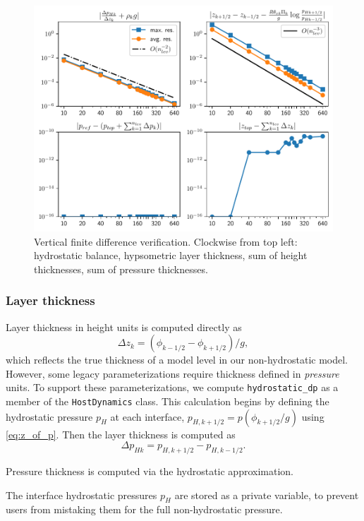 \begin{figure}[H]
\centering 
\includegraphics[width=0.8\linewidth]{figures/vconv_plot}
\caption{Vertical finite difference verification. Clockwise from top left: hydrostatic balance, hypsometric layer thickness, sum of height thicknesses, sum of pressure thicknesses.}\label{fig:fd_verification}
\end{figure}

\subsubsection{Layer thickness}

Layer thickness in height units is computed directly as 
\begin{equation}\label{eq:z_thick}
  \Delta z_k = \left(\phi_{k-1/2} - \phi_{k+1/2}\right)/g,
\end{equation}
which reflects the true thickness of a model level in our non-hydrostatic model.
However, some legacy parameterizations require thickness defined in \emph{pressure} units.
To support these parameterizations, we compute \texttt{hydrostatic\_dp} as a member of the \texttt{HostDynamics} class.
This calculation begins by defining the hydrostatic pressure $p_H$ at each interface, $p_{H,k+1/2} = p(\phi_{k+1/2}/g)$ using \eqref{eq:z_of_p}.
Then the layer thickness is computed as
\begin{equation}\label{eq:p_thick}
  \Delta p_{Hk} = p_{H,k+1/2} - p_{H,k-1/2}.
\end{equation}
\begin{assume}
  Pressure thickness is computed via the hydrostatic approximation.  
\end{assume}

The interface hydrostatic pressures $p_H$ are stored as a private variable, to prevent users from mistaking them for the full non-hydrostatic pressure.

